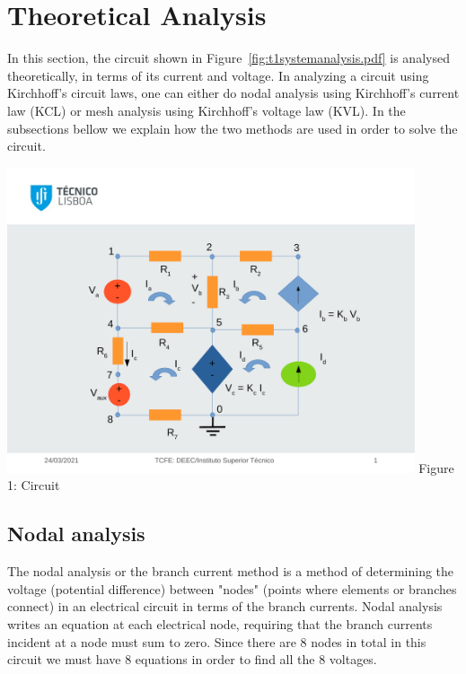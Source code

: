 \section{Theoretical Analysis}
\label{sec:analysis}

In this section, the circuit shown in Figure~\ref{fig:t1systemanalysis.pdf} is analysed
theoretically, in terms of its current and voltage.
In analyzing a circuit using Kirchhoff's circuit laws, one can either do nodal analysis using Kirchhoff's current law (KCL) or mesh analysis using Kirchhoff's voltage law (KVL).
In the subsections bellow we explain how the two methods are used in order to solve the circuit. 


\begin{center}

\includegraphics[width  = 12cm]{t1systemanalysis.pdf}
{Figure 1: Circuit}
\end{center}


\subsection{Nodal analysis}
The nodal analysis or the branch current method is a method of determining the voltage (potential difference) between "nodes" (points where elements or branches connect) in an electrical circuit in terms of the branch currents. 
Nodal analysis writes an equation at each electrical node, requiring that the branch currents incident at a node must sum to zero.
Since there are 8 nodes in total in this circuit we must have 8 equations in order to find all the 8 voltages.



